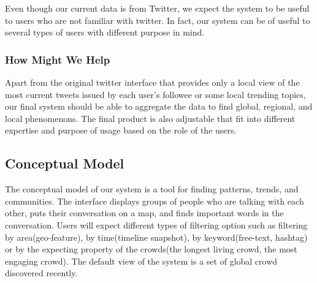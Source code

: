 \documentclass{sig-alternate}
\begin{document}
Even though our current data is from Twitter, we expect the system to be useful to users who are not familiar with twitter. In fact, our system can be of useful to several types of users with different purpose in mind.

\subsubsection{How Might We Help}
Apart from the original twitter interface that provides only a local view of the most current tweets issued by each user's followee or some local trending topics, our final system should be able to aggregate the data to find global, regional, and local phenomenons. The final product is also adjustable that fit into different expertise and purpose of usage based on the role of the users.

\subsection{Conceptual Model}
The conceptual model of our system is a tool for finding patterns, trends, and communities. The interface displays groups of people who are talking with each other, puts their conversation on a map, and finds important words in the conversation. Users will expect different types of filtering option such as filtering by area(geo-feature), by time(timeline snapshot), by keyword(free-text, hashtag) or by the expecting property of the crowds(the longest living crowd, the most engaging crowd). The default view of the system is a set of global crowd discovered recently.
\end{document}
